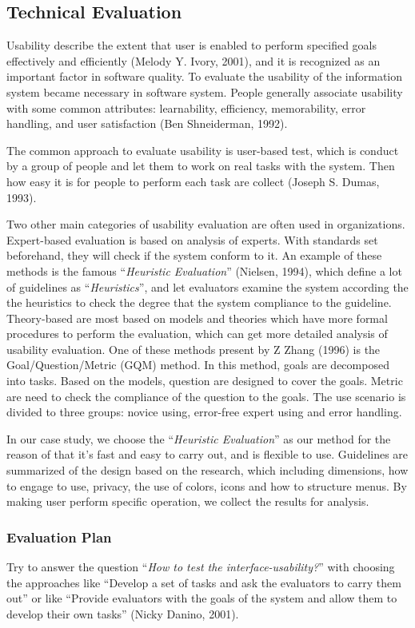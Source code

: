 \documentclass[twocolumn]{article}
\begin{document}
\subsection{Technical Evaluation}
Usability describe the extent that user is enabled to perform specified goals effectively and efficiently (Melody Y. Ivory, 2001), and it is recognized as an important factor in software quality. To evaluate the usability of the information system became necessary in software system. People generally associate usability with some common attributes: learnability, efficiency, memorability, error handling, and user satisfaction (Ben Shneiderman, 1992). 

The common approach to evaluate usability is user-based test, which is conduct by a group of people and let them to work on real tasks with the system. Then how easy it is for people to perform each task are collect (Joseph S. Dumas, 1993).

Two other main categories of usability evaluation are often used in organizations. Expert-based evaluation is based on analysis of experts. With standards set beforehand, they will check if the system conform to it. An example of these methods is the famous “\emph{Heuristic Evaluation}” (Nielsen, 1994), which define a lot of guidelines as “\emph{Heuristics}”, and let evaluators examine the system according the the heuristics to check the degree that the system compliance to the guideline. Theory-based are most based on models and theories which have more formal procedures to perform the evaluation, which can get more detailed analysis of usability evaluation. One of these methods present by Z Zhang (1996) is the Goal/Question/Metric (GQM) method. In this method, goals are decomposed into tasks. Based on the models, question are designed to cover the goals. Metric are need to check the compliance of the question to the goals. The use scenario is divided to three groups: novice using, error-free expert using and error handling.

In our case study, we choose the “\emph{Heuristic Evaluation}” as our method for the reason of that it’s fast and easy to carry out, and is flexible to use. Guidelines are summarized of the design based on the research, which including dimensions, how to engage to use, privacy, the use of colors, icons and how to structure menus. By making user perform specific operation, we collect the results for analysis.

\subsubsection{Evaluation Plan}
Try to answer the question “\emph{How to test the interface-usability?}”  with choosing the approaches like “Develop a set of tasks and ask the evaluators to carry them out” or like “Provide evaluators with the goals of the system and allow them to develop their own tasks” (Nicky Danino, 2001).
\end{document}
